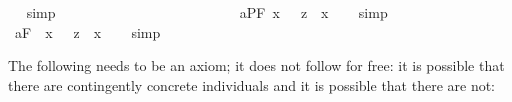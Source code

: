 \begin{isabellebody}
\isadelimproof
\ %
\endisadelimproof
%
\isatagproof
{}\isamarkupfalse%
\ simp\ \isamarkupfalse%
%
\endisatagproof
{\isafoldproof}%
%
\isadelimproof
%
\endisadelimproof
\ \ \ \ \ \ \ \ \ \ \ \ \ \ \ \ \ \ \ \ \ \ \ \isanewline
{}\isamarkupfalse%
\ a{}{}{\isacharunderscore}{}{\isacharunderscore}PF{\isacharcolon}\ {\isachardoublequoteopen}{\isacharbrackleft}{\isacharparenleft}{\isasymforall}{\isacharparenleft}{\isasymlambda}x{\isachardot}\ {\isasymbox}\ {\isacharcomma}{\isasymphi}{\isacharcomma}{\isacharparenright}{\isacharparenright}\ {\isasymrightarrow}\isactrlsup z\ {\isasymbox}\ {\isacharparenleft}{\isasymforall}{\isacharparenleft}{\isasymlambda}x{\isachardot}\ {\isacharcomma}{\isasymphi}{\isacharcomma}{\isacharparenright}{\isacharparenright}{\isacharbrackright}{\isachardoublequoteclose}%
\isadelimproof
\ %
\endisadelimproof
%
\isatagproof
{}\isamarkupfalse%
\ simp\ \isamarkupfalse%
%
\endisatagproof
{\isafoldproof}%
%
\isadelimproof
%
\endisadelimproof
\ \ \ \ \ \ \ \ \ \ \ \isanewline
{}\isamarkupfalse%
\ a{}{}{\isacharunderscore}{}{\isacharunderscore}F{\isacharcolon}\ \ {\isachardoublequoteopen}{\isacharbrackleft}{\isacharparenleft}{\isasymforall}{\isacharparenleft}{\isasymlambda}x{\isachardot}\ {\isasymbox}\ {\isacharsemicolon}{\isasymphi}{\isacharsemicolon}{\isacharparenright}{\isacharparenright}\ {\isasymrightarrow}\isactrlsup z\ {\isasymbox}\ {\isacharparenleft}{\isasymforall}{\isacharparenleft}{\isasymlambda}x{\isachardot}\ {\isacharsemicolon}{\isasymphi}{\isacharsemicolon}{\isacharparenright}{\isacharparenright}{\isacharbrackright}{\isachardoublequoteclose}%
\isadelimproof
\ %
\endisadelimproof
%
\isatagproof
{}\isamarkupfalse%
\ simp\ \isamarkupfalse%
%
\endisatagproof
{\isafoldproof}%
%
\isadelimproof
%
\endisadelimproof
%
\begin{isamarkuptext}%
The following needs to be an axiom; it does not follow for free: it is possible that there 
are contingently concrete individuals and it is possible that there are not:%
\end{isamarkuptext}%
\isamarkuptrue%
\isamarkupfalse%
\ \isanewline

\end{isabellebody}
